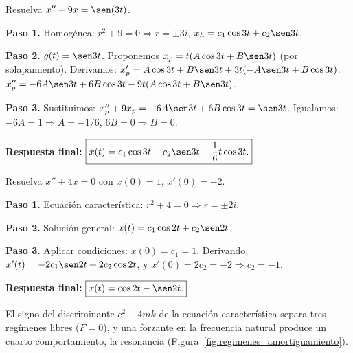 \begin{example}
Resuelva $x'' + 9x = \sen(3t)$.

\begin{myproof}
\textbf{Paso 1.} Homogénea: $r^2+9=0 \Rightarrow r=\pm 3i$, $x_h = c_1 \cos 3t + c_2 \sen 3t$.

\textbf{Paso 2.} $g(t)=\sen 3t$. Proponemos $x_p = t(A\cos 3t + B\sen 3t)$ (por solapamiento). Derivamos: $x_p' = A\cos 3t + B\sen 3t + 3t(-A\sen 3t + B\cos 3t)$. $x_p'' = -6A\sen 3t + 6B\cos 3t - 9t(A\cos 3t + B\sen 3t)$.

\textbf{Paso 3.} Sustituimos: $x_p'' + 9x_p = -6A\sen 3t + 6B\cos 3t = \sen 3t$. Igualamos: $-6A=1 \Rightarrow A=-1/6$, $6B=0 \Rightarrow B=0$.

\textbf{Respuesta final:} $\boxed{x(t) = c_1 \cos 3t + c_2 \sen 3t - \frac{1}{6}t \cos 3t.}$
\end{myproof}
\end{example}

\begin{example}
Resuelva $x''+4x=0$ con $x(0)=1$, $x'(0)=-2$.

\begin{myproof}
\textbf{Paso 1.} Ecuación característica: $r^2+4=0 \Rightarrow r=\pm 2i$.

\textbf{Paso 2.} Solución general: $x(t)=c_1\cos 2t+c_2\sen 2t$.

\textbf{Paso 3.} Aplicar condiciones: $x(0)=c_1=1$. Derivando, $x'(t)=-2c_1\sen 2t+2c_2\cos 2t$, y $x'(0)=2c_2=-2\Rightarrow c_2=-1$.

\textbf{Respuesta final:} $\boxed{x(t)=\cos 2t-\sen 2t.}$
\end{myproof}
\end{example}

El signo del discriminante $c^2-4mk$ de la ecuación característica separa tres regímenes libres ($F=0$), y una forzante en la frecuencia natural produce un cuarto comportamiento, la resonancia (Figura~\ref{fig:regimenes_amortiguamiento}).

